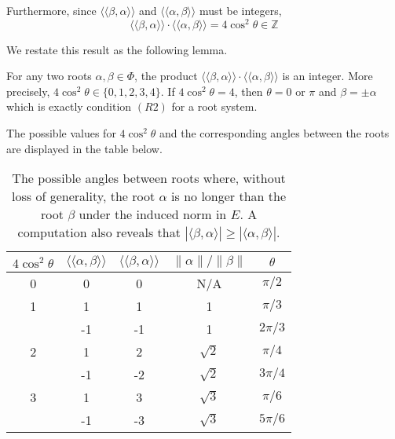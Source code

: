 Furthermore, since $\langle \langle \beta, \alpha \rangle \rangle$ and $\langle \langle \alpha, \beta \rangle \rangle$ must be integers,
\begin{equation*}
    \langle \langle \beta, \alpha \rangle \rangle \cdot \langle \langle \alpha, \beta \rangle \rangle = 4 \cos^2 \theta \in \mathbb{Z}
\end{equation*}

We restate this result as the following lemma.
\begin{lemma}
    For any two roots $\alpha, \beta \in \Phi$, the product $\langle \langle \beta, \alpha \rangle \rangle \cdot \langle \langle \alpha, \beta \rangle \rangle$ is an integer.
    More precisely, $4 \cos^2 \theta \in \{ 0, 1, 2, 3, 4 \}.$
    If $4 \cos^2 \theta = 4$, then $\theta = 0$ or $\pi$ and $\beta = \pm \alpha$ which is exactly condition $(R2)$ for a root system.
\end{lemma}

The possible values for $4 \cos^2 \theta$ and the corresponding angles between the roots are displayed in the table below.

\begin{table}[h]
\begin{center}
\begin{tabular}{|| c  c  c  c  c ||}
    \hline $4\cos^2\theta$
&   $\langle \langle \alpha, \beta \rangle \rangle$
&   $\langle \langle \beta, \alpha \rangle \rangle$
&   $\|\alpha\| / \|\beta\|$
&   $\theta$ \\ \hline \hline
    0 & 0 & 0 & N/A & $\pi/2$ \\ \hline
    
    1 & 1 & 1 & 1 & $\pi/3$ \\
      & -1 & -1 & 1 & $2\pi/3$ \\ \hline
    
    2 & 1 & 2 & $\sqrt{2}$ & $\pi/4$  \\
      & -1 & -2 & $\sqrt{2}$ & $3\pi/4$ \\ \hline
    
    3 & 1 & 3 & $\sqrt{3}$ & $\pi/6$ \\
      &-1 & -3 & $\sqrt{3}$ & $5\pi/6$ \\ \hline
\end{tabular}
\end{center}
\caption{The possible angles between roots where, without loss of generality,
the root $\alpha$ is no longer than the root $\beta$ under the induced norm in $E$.
A computation also reveals that $|\langle \beta, \alpha \rangle| \geq |\langle \alpha, \beta \rangle|$.}
\end{table}

